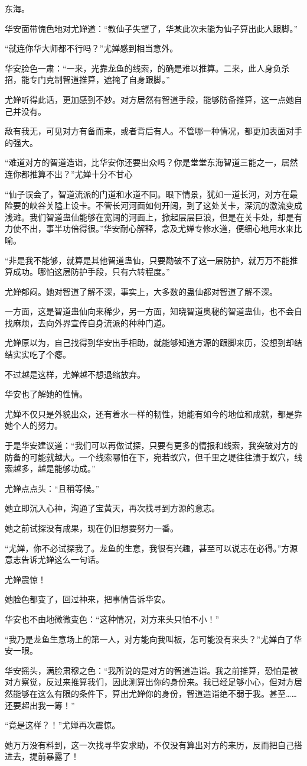 \begin{this_body}
东海。

华安面带愧色地对尤婵道：“教仙子失望了，华某此次未能为仙子算出此人跟脚。”

“就连你华大师都不行吗？”尤婵感到相当意外。

华安脸色一肃：“一来，光靠龙鱼的线索，的确是难以推算。二来，此人身负杀招，能专门克制智道推算，遮掩了自身跟脚。”

尤婵听得此话，更加感到不妙。对方居然有智道手段，能够防备推算，这一点她自己并没有。

敌有我无，可见对方有备而来，或者背后有人。不管哪一种情况，都更加表面对手的强大。

“难道对方的智道造诣，比华安你还要出众吗？你是堂堂东海智道三能之一，居然连你都推算不出？”尤婵十分不甘心

“仙子误会了，智道流派的门道和水道不同。眼下情景，犹如一道长河，对方在最险要的峡谷关隘上设卡。不管长河河面如何开阔，到了这处关卡，深沉的激流变成浅滩。我们智道蛊仙能够在宽阔的河面上，掀起层层巨浪，但是在关卡处，却是有力使不出，事半功倍得很。”华安耐心解释，念及尤婵专修水道，便细心地用水来比喻。

“非是我不能够，就算是其他智道蛊仙，只要勘破不了这一层防护，就万万不能推算成功。哪怕这层防护手段，只有六转程度。”

尤婵郁闷。她对智道了解不深，事实上，大多数的蛊仙都对智道了解不深。

一方面，这是智道蛊仙向来稀少，另一方面，知晓智道奥秘的智道蛊仙，也不会自找麻烦，去向外界宣传自身流派的种种门道。

尤婵原以为，自己找得到华安出手相助，就能够知道方源的跟脚来历，没想到却结结实实吃了个瘪。

不过越是这样，尤婵越不想退缩放弃。

华安也了解她的性情。

尤婵不仅只是外貌出众，还有着水一样的韧性，她能有如今的地位和成就，都是靠她个人的努力。

于是华安建议道：“我们可以再做试探，只要有更多的情报和线索，我突破对方的防备的可能就越大。一个线索哪怕在下，宛若蚁穴，但千里之堤往往溃于蚁穴，线索越多，越是能够功成。”

尤婵点点头：“且稍等候。”

她立即沉入心神，沟通了宝黄天，再次找寻到方源的意志。

她之前试探没有成果，现在仍旧想要努力一番。

“尤婵，你不必试探我了。龙鱼的生意，我很有兴趣，甚至可以说志在必得。”方源意志告诉尤婵这么一句话。

尤婵震惊！

她脸色都变了，回过神来，把事情告诉华安。

华安也不由地微微变色：“这种情况，对方来头只怕不小！”

“我乃是龙鱼生意场上的第一人，对方能向我叫板，怎可能没有来头？”尤婵白了华安一眼。

华安摇头，满脸肃穆之色：“我所说的是对方的智道造诣。我之前推算，恐怕是被对方察觉，反过来推算我们，因此测算出你的身份来。我已经足够小心，但对方居然能够在这么有限的条件下，算出尤婵你的身份，智道造诣绝不弱于我。甚至……还要超出我一筹！”

“竟是这样？！”尤婵再次震惊。

她万万没有料到，这一次找寻华安求助，不仅没有算出对方的来历，反而把自己搭进去，提前暴露了！

\end{this_body}

